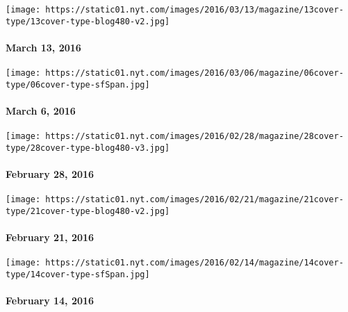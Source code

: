 \href{http://www.nytimes.com/indexes/2016/03/17/magazine/index.html}{}

\texttt{[image: https://static01.nyt.com/images/2016/03/13/magazine/13cover-type/13cover-type-blog480-v2.jpg]}

\hypertarget{march-13-2016}{%
\paragraph{March 13, 2016}\label{march-13-2016}}

\href{http://www.nytimes.com/indexes/2016/03/06/magazine/index.html}{}

\texttt{[image: https://static01.nyt.com/images/2016/03/06/magazine/06cover-type/06cover-type-sfSpan.jpg]}

\hypertarget{march-6-2016}{%
\paragraph{March 6, 2016}\label{march-6-2016}}

\href{http://www.nytimes.com/indexes/2016/02/28/magazine/index.html}{}

\texttt{[image: https://static01.nyt.com/images/2016/02/28/magazine/28cover-type/28cover-type-blog480-v3.jpg]}

\hypertarget{february-28-2016}{%
\paragraph{February 28, 2016}\label{february-28-2016}}

\href{http://www.nytimes.com/indexes/2016/02/22/magazine/index.html}{}

\texttt{[image: https://static01.nyt.com/images/2016/02/21/magazine/21cover-type/21cover-type-blog480-v2.jpg]}

\hypertarget{february-21-2016}{%
\paragraph{February 21, 2016}\label{february-21-2016}}

\href{http://www.nytimes.com/indexes/2016/02/14/magazine/index.html}{}

\texttt{[image: https://static01.nyt.com/images/2016/02/14/magazine/14cover-type/14cover-type-sfSpan.jpg]}

\hypertarget{february-14-2016}{%
\paragraph{February 14, 2016}\label{february-14-2016}}

